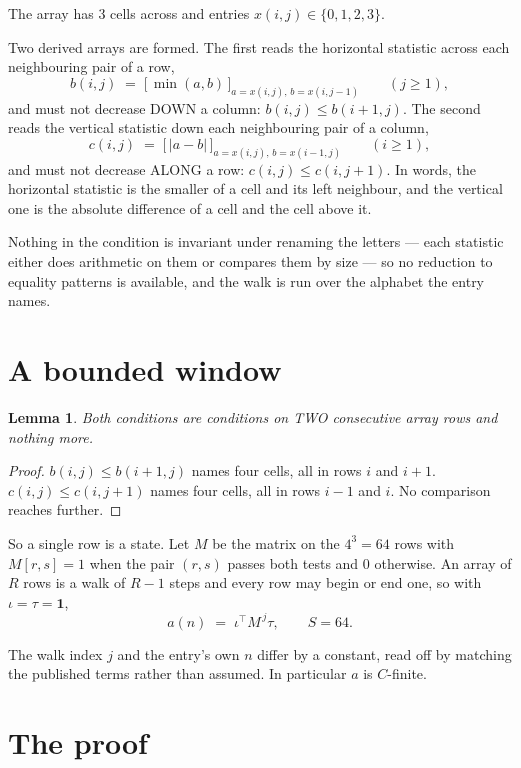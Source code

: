\documentclass[11pt,a4paper]{article}
\theoremstyle{plain}
\newtheorem{lemma}[theorem]{Lemma}
\theoremstyle{definition}
\begin{document}
The array has $3$ cells across and entries $x(i,j)\in\{0,1,2,3\}$.

Two derived arrays are formed. The first reads the horizontal statistic across each
neighbouring pair of a row,
\[
b(i,j)\;=\;\bigl[\,\min(a,b)\,\bigr]_{a=x(i,j),\,b=x(i,j-1)}\qquad (j\ge1),
\]
and must not decrease DOWN a column: $b(i,j)\le b(i{+}1,j)$. The second reads the vertical
statistic down each neighbouring pair of a column,
\[
c(i,j)\;=\;\bigl[\,\lvert a-b\rvert\,\bigr]_{a=x(i,j),\,b=x(i{-}1,j)}\qquad (i\ge1),
\]
and must not decrease ALONG a row: $c(i,j)\le c(i,j{+}1)$. In words, the horizontal statistic
is the smaller of a cell and its left neighbour, and the vertical one is
the absolute difference of a cell and the cell above it.

Nothing in the condition is invariant under renaming the letters --- each statistic either does
arithmetic on them or compares them by size --- so no reduction to equality patterns is
available, and the walk is run over the alphabet the entry names.

\section{A bounded window}

\begin{lemma}\label{lem:win}
Both conditions are conditions on TWO consecutive array rows and nothing more.
\end{lemma}

\begin{proof}
$b(i,j)\le b(i{+}1,j)$ names four cells, all in rows $i$ and $i+1$. $c(i,j)\le c(i,j{+}1)$
names four cells, all in rows $i-1$ and $i$. No comparison reaches further.
\end{proof}

So a single row is a state. Let $M$ be the matrix on the $4^{3}=64$ rows with
$M[r,s]=1$ when the pair $(r,s)$ passes both tests and $0$ otherwise. An array of $R$ rows is a
walk of $R-1$ steps and every row may begin or end one, so with $\iota=\tau=\mathbf{1}$,
\[
a(n)\;=\;\iota^{\!\top}M^{\,j}\tau ,\qquad S=64.
\]

The walk index $j$ and the entry's own $n$ differ by a constant, read off by matching the
published terms rather than assumed. In particular $a$ is $C$-finite.

\section{The proof}
\end{document}
